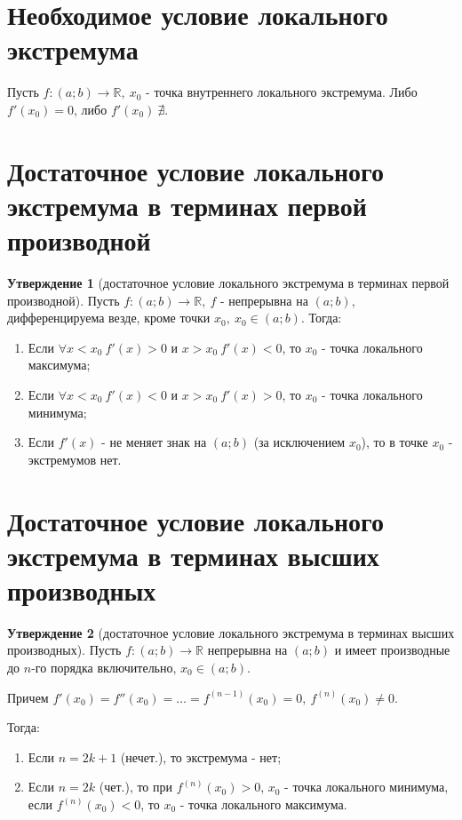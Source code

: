 \documentclass{report}
\theoremstyle{definition}
\newtheorem*{statement}{Утверждение}
\begin{document}
\section{Необходимое условие локального экстремума}

Пусть $f:(a;b)\rightarrow\mathbb{R}, \ x_0$ - точка внутреннего локального экстремума. Либо
$f'(x_0) = 0$, либо $f'(x_0) \ \nexists$.

\section{Достаточное условие локального экстремума в терминах первой производной}

\begin{statement}[достаточное условие локального экстремума в терминах первой производной]
    Пусть $f:(a;b)\rightarrow\mathbb{R}, \ f$ - непрерывна на $(a;b)$, дифференцируема везде,
    кроме точки $x_0, \ x_0 \in (a;b)$. Тогда:
    \begin{enumerate}
        \item Если $\forall x < x_0 \ f'(x) > 0$ и $x > x_0 \ f'(x)<0$, то $x_0$ - точка
              локального максимума;
        \item Если $\forall x < x_0 \ f'(x) < 0$ и $x > x_0 \ f'(x)>0$, то $x_0$ - точка
              локального минимума;
        \item Если $f'(x)$ - не меняет знак на $(a;b)$ (за исключением $x_0$), то в точке
              $x_0$ - экстремумов нет.
    \end{enumerate}
\end{statement}

\section{Достаточное условие локального экстремума в терминах высших производных}

\begin{statement}[достаточное условие локального экстремума в терминах высших производных]
    Пусть $f:(a;b)\rightarrow\mathbb{R}$ непрерывна на $(a;b)$ и имеет производные до $n$-го
    порядка включительно, $x_0\in (a;b)$.

    Причем $f'(x_0) = f''(x_0) = \ldots = f^{(n-1)}(x_0) = 0, \ f^{(n)}(x_0) \ne 0$.

    Тогда:
    \begin{enumerate}
        \item Если $n = 2k + 1$ (нечет.), то экстремума - нет;
        \item Если $n = 2k$ (чет.), то при $f^{(n)}(x_0) > 0$, $x_0$ - точка локального
              минимума, если $f^{(n)}(x_0) < 0$, то $x_0$ - точка локального максимума.
    \end{enumerate}
\end{statement}
\end{document}
